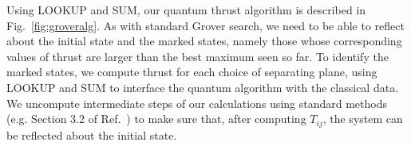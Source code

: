 \documentclass[aps,prd,twocolumn,superscriptaddress,preprintnumbers,nofootinbib,longbibliography,floatfix]{revtex4-1}
\DeclareRobustCommand{\Fig}[1]{Fig.~\ref{#1}}
\DeclareRobustCommand{\Ref}[1]{Ref.~\cite{#1}}
\begin{document}
Using LOOKUP and SUM, our quantum thrust algorithm is described in \Fig{fig:groveralg}.
%
As with standard Grover search, we need to be able to reflect about the initial state and the marked states, namely those whose corresponding values of thrust are larger than the best maximum seen so far.
%
To identify the marked states, we compute thrust for each choice of separating plane, using LOOKUP and SUM to interface the quantum algorithm with the classical data.
%
We uncompute intermediate steps of our calculations using standard methods (e.g.
Section 3.2 of \Ref{Nielsen:2011:QCQ:1972505}) to make sure that, after computing $T_{ij}$, the system can be reflected about the initial state.


\begin{figure*}[t]
\end{figure*}
\end{document}
